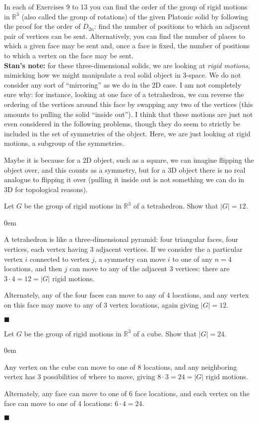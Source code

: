 \documentclass[12pt]{article}
\renewcommand{\qed}{\hfill$\blacksquare$}
\renewenvironment{proof}{\begin{addmargin}[1em]{0em}\begin{newproof}}{\end{newproof}\end{addmargin}\qed}
\newenvironment{problem}[2][Exercise]{\begin{trivlist}
\item[\hskip \labelsep {\bfseries #1}\hskip \labelsep {\bfseries #2.}]}{\end{trivlist}}
\begin{document}
In each of Exercises 9 to 13 you can find the order of the group of rigid motions in $\mathbb{R}^3$ (also called the group of rotations) of the given Platonic solid by following the proof for the order of $D_{2n}$: find the number of positions to which an adjacent pair of vertices can be sent. Alternatively, you can find the number of places to which a given face may be sent and, once a face is fixed, the number of positions to which a vertex on the face may be sent.\\

\textbf{Stan's note:} for these three-dimensional solids, we are looking at \textit{rigid motions}, mimicking how we might manipulate a real solid object in 3-space. We do not consider any sort of ``mirroring'' as we do in the 2D case. I am not completely sure why: for instance, looking at one face of a tetrahedron, we can reverse the ordering of the vertices around this face by swapping any two of the vertices (this amounts to pulling the solid ``inside out''). I think that these motions are just not even considered in the following problems, though they do seem to strictly be included in the set of symmetries of the object. Here, we are just looking at rigid motions, a subgroup of the symmetries.

Maybe it is because for a 2D object, such as a square, we can imagine flipping the object over, and this counts as a symmetry, but for a 3D object there is no real analogue to flipping it over (pulling it inside out is not something we can do in 3D for topological reasons).

\begin{problem}{1.2.9}
Let $G$ be the group of rigid motions in $\mathbb{R}^3$ of a tetrahedron. Show that $\left|G\right|=12$.
\end{problem}
\begin{proof}
A tetrahedron is like a three-dimensional pyramid: four triangular faces, four vertices, each vertex having 3 adjacent vertices. If we consider the a particular vertex $i$ connected to vertex $j$, a symmetry can move $i$ to one of any $n=4$ locations, and then $j$ can move to any of the adjacent 3 vertices: there are $3\cdot 4=12 =\left|G\right|$ rigid motions.

Alternately, any of the four faces can move to any of 4 locations, and any vertex on this face may move to any of 3 vertex locations, again giving $\left|G\right|=12$.
\end{proof}

\begin{problem}{1.2.10}
Let $G$ be the group of rigid motions in $\mathbb{R}^3$ of a cube. Show that $\left|G\right|=24$.
\end{problem}
\begin{proof}
Any vertex on the cube can move to one of 8 locations, and any neighboring vertex has 3 possibilities of where to move, giving $8\cdot 3 = 24 =\left|G\right|$ rigid motions.

Alternately, any face can move to one of 6 face locations, and each vertex on the face can move to one of 4 locations: $6\cdot 4 = 24$.
\end{proof}
\end{document}
